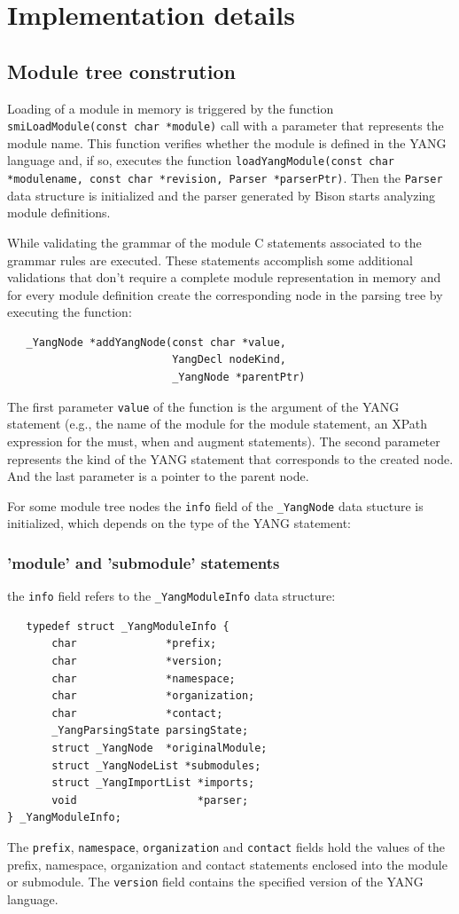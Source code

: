 \documentclass[conference]{IEEEtran}
\begin{document}
\section{Implementation details}
\subsection{Module tree constrution}
Loading of a module in memory is triggered by the function \texttt{smiLoadModule(const char *module)} call with a parameter that represents the module name. This function verifies whether the module is defined in the YANG language and, if so, executes the function \texttt{loadYangModule(const char *modulename, const char *revision, Parser *parserPtr)}. Then the \texttt{Parser} data structure is initialized and the parser generated by Bison starts analyzing module definitions.

While validating the grammar of the module C statements associated to the grammar rules are executed. These statements accomplish some additional validations that don't require a complete module representation in memory and for every module definition create the corresponding node in the parsing tree by executing the function:

\small
\begin{verbatim}
   _YangNode *addYangNode(const char *value, 
                          YangDecl nodeKind, 
                          _YangNode *parentPtr)
\end{verbatim}
\normalsize

The first parameter \texttt{value} of the function is the argument of the YANG statement (e.g., the name of the module for the module statement, an XPath expression for the must, when and augment statements). The second parameter represents the kind of the YANG statement that corresponds to the created node. And the last parameter is a pointer to the parent node.

For some module tree nodes the \texttt{info} field of the \texttt{\_YangNode} data stucture is initialized, which depends on the type of the YANG statement:
\subsubsection{'module' and 'submodule' statements}
the \texttt{info} field refers to the \texttt{\_YangModuleInfo} data structure:

\small
\begin{verbatim}
   typedef struct _YangModuleInfo {
       char              *prefix;
       char              *version;
       char              *namespace;
       char              *organization;
       char              *contact;
       _YangParsingState parsingState;
       struct _YangNode  *originalModule;
       struct _YangNodeList *submodules;
       struct _YangImportList *imports;
       void                   *parser;
} _YangModuleInfo;
\end{verbatim}
\normalsize
The \texttt{prefix}, \texttt{namespace}, \texttt{organization} and \texttt{contact} fields hold the values of the prefix, namespace, organization and contact statements enclosed into the module or submodule. The \texttt{version} field contains the specified version of the YANG language.
\end{document}
